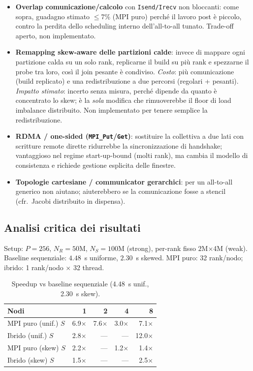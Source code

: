 \documentclass[11pt,a4paper]{article}
\theoremstyle{remark}
\begin{document}
\begin{itemize}
  \item \textbf{Overlap comunicazione/calcolo} con \texttt{Isend/Irecv} non bloccanti: come sopra, guadagno stimato $\le$7\% (MPI puro) perch\'e il lavoro post \`e piccolo, contro la perdita dello scheduling interno dell'all-to-all tunato. Trade-off aperto, non implementato.
  \item \textbf{Remapping skew-aware delle partizioni calde}: invece di mappare ogni partizione calda su un solo rank, replicarne il build su pi\`u rank e spezzarne il probe tra loro, cos\`i il join pesante \`e condiviso. \emph{Costo}: pi\`u comunicazione (build replicato) e una redistribuzione a due percorsi (regolari + pesanti). \emph{Impatto stimato}: incerto senza misura, perch\'e dipende da quanto \`e concentrato lo skew; \`e la \emph{sola} modifica che rimuoverebbe il floor di load imbalance distribuito. Non implementato per tenere semplice la redistribuzione.
  \item \textbf{RDMA / one-sided (\texttt{MPI\_Put}/\texttt{Get})}: sostituire la collettiva a due lati con scritture remote dirette ridurrebbe la sincronizzazione di handshake; vantaggioso nel regime start-up-bound (molti rank), ma cambia il modello di consistenza e richiede gestione esplicita delle finestre.
  \item \textbf{Topologie cartesiane / communicator gerarchici}: per un all-to-all generico non aiutano; aiuterebbero se la comunicazione fosse a stencil (cfr.\ Jacobi distribuito in dispensa).
\end{itemize}

\subsection{Analisi critica dei risultati}

Setup: $P=256$, $N_R=50$M, $N_S=100$M (strong), per-rank fisso $2$M$\times$4M (weak). Baseline sequenziale: $4.48$~s uniforme, $2.30$~s skewed. MPI puro: 32 rank/nodo; ibrido: 1 rank/nodo $\times$ 32 thread.

\begin{table}[H]
\centering\small
\begin{tabular}{@{}lrrrr@{}}
\toprule
Nodi & 1 & 2 & 4 & 8 \\
\midrule
MPI puro (unif.) $S$  & 6.9$\times$ & 7.6$\times$ & 3.0$\times$ & 7.1$\times$ \\
Ibrido (unif.) $S$    & 2.8$\times$ & --- & --- & 12.0$\times$ \\
MPI puro (skew) $S$   & 2.2$\times$ & --- & 1.2$\times$ & 1.4$\times$ \\
Ibrido (skew) $S$     & 1.5$\times$ & --- & --- & 2.5$\times$ \\
\bottomrule
\end{tabular}
\caption{Speedup vs baseline sequenziale (4.48~s unif., 2.30~s skew).}
\label{tab:m4}
\end{table}
\end{document}
